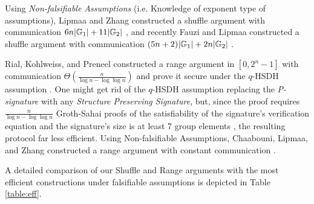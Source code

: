 Using \emph{Non-falsifiable Assumptions} (i.e. Knowledge of exponent type of assumptions), Lipmaa and Zhang constructed a shuffle argument with communication $6n|\mathbb{G}_1|+11|\mathbb{G}_2|$ \cite{SCN:LipZha12}, and recently Fauzi and Lipmaa constructed a shuffle argument with communication $(5n+2)|\mathbb{G}_1|+2n|\mathbb{G}_2|$ \cite{EPRINT:FauLip15}.

Rial, Kohlweiss, and Preneel constructed a range argument in $[0,2^n-1]$ with communication $\Theta(\frac{n}{\log n -\log\log n})$ and prove it secure under the $q$-HSDH assumption \cite{PAIRING:RiaKohPre09}. One might get rid of the $q$-HSDH assumption replacing the \emph{P-signature} with any \emph{Structure Preserving Signature}, but, since the proof requires $\frac{n}{\log n-\log \log n}$ Groth-Sahai proofs of the satisfiability of the signature's verification equation and the signature's size is at least 7 group elements \cite{C:KilPanWee15,C:LibPetYun15}, the resulting protocol far less efficient.
Using Non-falsifiable Assumptions, Chaabouni, Lipmaa, and Zhang constructed a range argument with constant communication \cite{FC:ChaLipZha12}. 

A detailed comparison of our Shuffle and Range arguments with the most efficient constructions under falsifiable assumptions is depicted in Table \ref{table:eff}.



